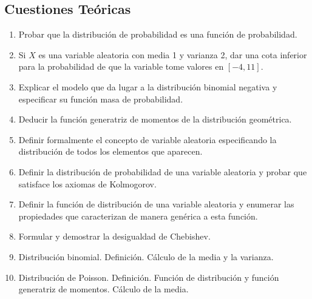 \documentclass[fleqn]{article}
\begin{document}
\begin{enumerate}
                
                \newpage
                
                \subsection{Cuestiones Teóricas}

                        \begin{enumerate}
                                \item Probar que la distribución de probabilidad es una función de probabilidad.
                                \item Si $X$ es una variable aleatoria con media 1 y varianza 2, dar una cota inferior para la probabilidad
                                        de que la variable tome valores en $[-4, 11]$.
                                \item Explicar el modelo que da lugar a la distribución binomial negativa y especificar su función masa de probabilidad.
                                \item Deducir la función generatriz de momentos de la distribución geométrica.
                                \item Definir formalmente el concepto de variable aleatoria especificando la distribución de todos los elementos
                                        que aparecen.
                                \item Definir la distribución de probabilidad de una variable aleatoria y probar que satisface los axiomas de Kolmogorov.
                                \item Definir la función de distribución de una variable aleatoria y enumerar las propiedades que caracterizan de manera
                                        genérica a esta función.
                                \item Formular y demostrar la desigualdad de Chebishev.
                                \item Distribución binomial. Definición. Cálculo de la media y la varianza.
                                \item Distribución de Poisson. Definición. Función de distribución y función generatriz de momentos. Cálculo de la media.
                                
                                        
                                
                        \end{enumerate}



\end{enumerate}
\end{document}
